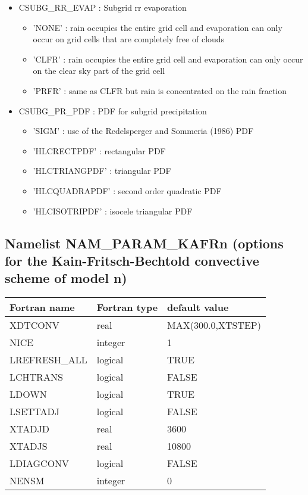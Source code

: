 \begin{itemize}
\item
CSUBG\_RR\_EVAP :
Subgrid rr evaporation
\begin{itemize}
\item{'NONE'} : rain occupies the entire grid cell and evaporation can only occur on grid cells that are completely free of clouds
\item{'CLFR'} : rain occupies the entire grid cell and evaporation can only occur on the clear sky part of the grid cell
\item{'PRFR'} : same as CLFR but rain is concentrated on the rain fraction
\end{itemize}

\item
CSUBG\_PR\_PDF :
PDF for subgrid precipitation
\begin{itemize}
\item{'SIGM'} : use of the Redelsperger and Sommeria (1986) PDF 
\item{'HLCRECTPDF'} : rectangular PDF
\item{'HLCTRIANGPDF'} : triangular PDF
\item{'HLCQUADRAPDF'} : second order quadratic PDF
\item{'HLCISOTRIPDF'} : isocele triangular PDF
\end{itemize}

\end{itemize}
\subsection{Namelist NAM\_PARAM\_KAFRn (options for the Kain-Fritsch-Bechtold convective
scheme of model n)}


\begin{center}
\begin{tabular} {|l|l|l|}
\hline
Fortran name & Fortran type & default value \\
\hline
XDTCONV      &  real         & MAX(300.0,XTSTEP) \\
NICE         &  integer      &   1               \\
LREFRESH\_ALL&  logical      &   TRUE            \\
LCHTRANS     &  logical      &   FALSE           \\
LDOWN        &  logical      &   TRUE            \\
LSETTADJ     &  logical      &   FALSE           \\
XTADJD       &  real         &   3600            \\
XTADJS       &  real         &  10800            \\
LDIAGCONV    &  logical      &   FALSE           \\
NENSM        &  integer      &     0             \\
\hline
\end{tabular}
\end{center}

